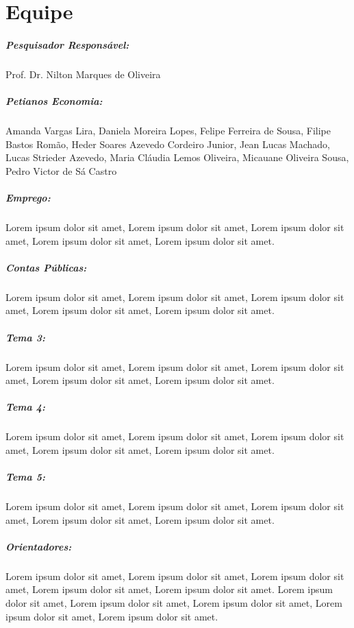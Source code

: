 \chapter*{Equipe}
  \begin{center}
    \parbox{0.7\linewidth}{
      \paragraph{Pesquisador Responsável:}
        Prof. Dr. Nilton Marques de Oliveira
      \paragraph{Petianos Economia:}
        Amanda Vargas Lira, Daniela Moreira Lopes, Felipe Ferreira de Sousa, Filipe Bastos Romão, Heder Soares Azevedo Cordeiro Junior, Jean Lucas Machado, Lucas Strieder Azevedo, Maria Cláudia Lemos Oliveira, Micauane Oliveira Sousa, Pedro Victor de Sá Castro
      \paragraph{Emprego:}
        Lorem ipsum dolor sit amet, Lorem ipsum dolor sit amet, Lorem ipsum dolor sit amet, Lorem ipsum dolor sit amet, Lorem ipsum dolor sit amet.
      \paragraph{Contas Públicas:}
        Lorem ipsum dolor sit amet, Lorem ipsum dolor sit amet, Lorem ipsum dolor sit amet, Lorem ipsum dolor sit amet, Lorem ipsum dolor sit amet.
      \paragraph{Tema 3:}
        Lorem ipsum dolor sit amet, Lorem ipsum dolor sit amet, Lorem ipsum dolor sit amet, Lorem ipsum dolor sit amet, Lorem ipsum dolor sit amet.
      \paragraph{Tema 4:}
        Lorem ipsum dolor sit amet, Lorem ipsum dolor sit amet, Lorem ipsum dolor sit amet, Lorem ipsum dolor sit amet, Lorem ipsum dolor sit amet.
      \paragraph{Tema 5:}
        Lorem ipsum dolor sit amet, Lorem ipsum dolor sit amet, Lorem ipsum dolor sit amet, Lorem ipsum dolor sit amet, Lorem ipsum dolor sit amet.
      \paragraph{Orientadores:}
        Lorem ipsum dolor sit amet, Lorem ipsum dolor sit amet, Lorem ipsum dolor sit amet, Lorem ipsum dolor sit amet, Lorem ipsum dolor sit amet. Lorem ipsum dolor sit amet, Lorem ipsum dolor sit amet, Lorem ipsum dolor sit amet, Lorem ipsum dolor sit amet, Lorem ipsum dolor sit amet.
    }
  \end{center}